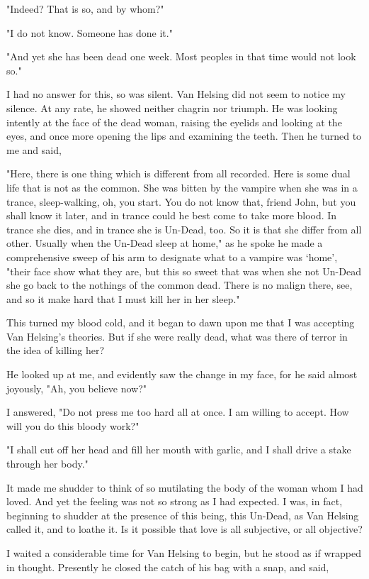 "Indeed? That is so, and by whom?" 

"I do not know. Someone has done it." 

"And yet she has been dead one week. Most peoples in that time would not look so." 

I had no answer for this, so was silent. Van Helsing did not seem to notice my silence. At any rate, he showed neither chagrin nor triumph. He was looking intently at the face of the dead woman, raising the eyelids and looking at the eyes, and once more opening the lips and examining the teeth. Then he turned to me and said, 

"Here, there is one thing which is different from all recorded. Here is some dual life that is not as the common. She was bitten by the vampire when she was in a trance, sleep-walking, oh, you start. You do not know that, friend John, but you shall know it later, and in trance could he best come to take more blood. In trance she dies, and in trance she is Un-Dead, too. So it is that she differ from all other. Usually when the Un-Dead sleep at home," as he spoke he made a comprehensive sweep of his arm to designate what to a vampire was `home', "their face show what they are, but this so sweet that was when she not Un-Dead she go back to the nothings of the common dead. There is no malign there, see, and so it make hard that I must kill her in her sleep." 

This turned my blood cold, and it began to dawn upon me that I was accepting Van Helsing's theories. But if she were really dead, what was there of terror in the idea of killing her? 

He looked up at me, and evidently saw the change in my face, for he said almost joyously, "Ah, you believe now?" 

I answered, "Do not press me too hard all at once. I am willing to accept. How will you do this bloody work?" 

"I shall cut off her head and fill her mouth with garlic, and I shall drive a stake through her body." 

It made me shudder to think of so mutilating the body of the woman whom I had loved. And yet the feeling was not so strong as I had expected. I was, in fact, beginning to shudder at the presence of this being, this Un-Dead, as Van Helsing called it, and to loathe it. Is it possible that love is all subjective, or all objective? 

I waited a considerable time for Van Helsing to begin, but he stood as if wrapped in thought. Presently he closed the catch of his bag with a snap, and said, 

